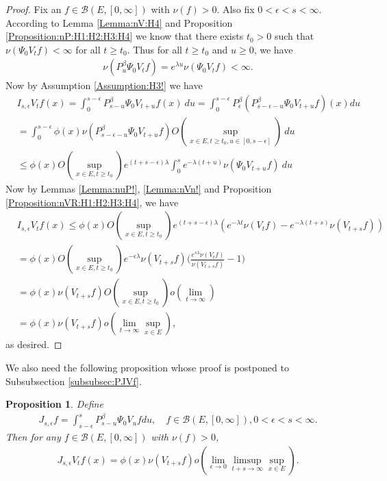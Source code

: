 \documentclass[12pt,a4paper]{amsart}
\numberwithin{equation}{section}
\theoremstyle{plain}
\newtheorem{prop}[thm]{Proposition}
\theoremstyle{definition}
\theoremstyle{remark}
\begin{document}
\begin{proof}
Fix an $f\in \mathcal B(E,[0,\infty])$ with $\nu(f)>0$.
Also fix $0<\epsilon < s< \infty$.
According to Lemma \ref{Lemma:nV:H4} and Proposition \ref{Proposition:nP:H1:H2:H3:H4} we know that 
there exists $t_0>0$ such that $\nu(\Psi_0 V_t f)< \infty$ for all $t\geq t_0$. Thus for all $t\geq t_0$ and $u\geq 0$, we have
\begin{align}
\nu(P_u^\beta \Psi_0 V_t f)
= e^{\lambda u}\nu(\Psi_0 V_t f)
< \infty.
\end{align}
Now by Assumption \ref{Assumption:H3!} we have
\begin{align}
 &I_{s,\epsilon} V_t f(x)
 = \int_0^{s- \epsilon} P_{s-u}^\beta \Psi_0 V_{t+u} f (x)~du
 = \int_0^{s- \epsilon} P_\epsilon^\beta (P_{s - \epsilon - u}^\beta \Psi_0 V_{t+u} f )(x) du
 \\&= \int_0^{s - \epsilon} \phi(x) \nu(P_{s - \epsilon - u}^{\beta} \Psi_0 V_{t+u} f) O(\sup_{x\in E, t\geq t_0, u\in [0,s-\epsilon]}) ~du
 \\&\leq \phi(x) O(\sup_{x\in E, t\geq t_0}) e^{(t+s-\epsilon)\lambda} \int_0^{s} e^{-\lambda (t+u)} \nu(\Psi_0 V_{t+u}f)~du
 \end{align}
Now by Lemmas \ref{Lemma:nuP!}, \ref{Lemma:nVn!} and Proposition \ref{Proposition:nVR:H1:H2:H3:H4}, we have
\begin{align}
  &I_{s,\epsilon} V_t f(x)
 \leq \phi(x) O(\sup_{x\in E, t\geq t_0}) e^{(t+s-\epsilon)\lambda} (e^{-\lambda t}\nu(V_tf)- e^{-\lambda(t+s)}\nu(V_{t+s}f))
 \\&= \phi(x) O(\sup_{x\in E, t\geq t_0})e^{-\epsilon \lambda} \nu(V_{t+s}f) \Big( \frac{e^{s \lambda }\nu(V_tf)}{\nu(V_{t+s}f)} - 1\Big)
 \\&= \phi(x) \nu(V_{t+s}f) O(\sup_{x\in E, t\geq t_0}) 
 o(\lim_{t\to \infty})
 \\&= \phi(x)\nu(V_{t+s}f)o(\lim_{t\to \infty} \sup_{x\in E}),
 \end{align}
as desired.
\end{proof}
We also need the following proposition whose proof is postponed to Subsubsection \ref{subsubsec:PJVf}.
\begin{prop} \label{Proposition:JVf:H1:H2:H3:H4}
Define
\begin{align}
 J_{s,\epsilon} f
 = \int_{s-\epsilon}^s P_{s-u}^\beta \Psi_0 V_u f du,
 \quad f\in \mathcal B(E,[0,\infty]), 0< \epsilon < s< \infty.
 \end{align}
Then for any $f\in \mathcal B(E,[0,\infty])$ with $\nu(f)>0$,
\begin{align}
 J_{s,\epsilon} V_tf(x)
 = \phi(x) \nu(V_{t+s}f) o(\lim_{\epsilon \to 0}\limsup_{t+s\to \infty} \sup_{x\in E}).
 \end{align}
\end{prop}
\end{document}
